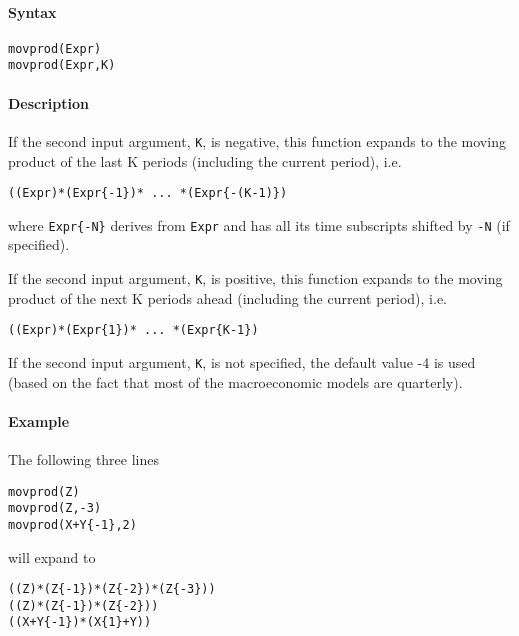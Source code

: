 


	\paragraph{Syntax}

\begin{verbatim}
movprod(Expr)
movprod(Expr,K)
\end{verbatim}

\paragraph{Description}

If the second input argument, \texttt{K}, is negative, this function
expands to the moving product of the last K periods (including the
current period), i.e.

\begin{verbatim}
((Expr)*(Expr{-1})* ... *(Expr{-(K-1)})
\end{verbatim}

where \texttt{Expr\{-N\}} derives from \texttt{Expr} and has all its
time subscripts shifted by \texttt{-N} (if specified).

If the second input argument, \texttt{K}, is positive, this function
expands to the moving product of the next K periods ahead (including the
current period), i.e.

\begin{verbatim}
((Expr)*(Expr{1})* ... *(Expr{K-1})
\end{verbatim}

If the second input argument, \texttt{K}, is not specified, the default
value -4 is used (based on the fact that most of the macroeconomic
models are quarterly).

\paragraph{Example}

The following three lines

\begin{verbatim}
movprod(Z)
movprod(Z,-3)
movprod(X+Y{-1},2)
\end{verbatim}

will expand to

\begin{verbatim}
((Z)*(Z{-1})*(Z{-2})*(Z{-3}))
((Z)*(Z{-1})*(Z{-2}))
((X+Y{-1})*(X{1}+Y))
\end{verbatim}


